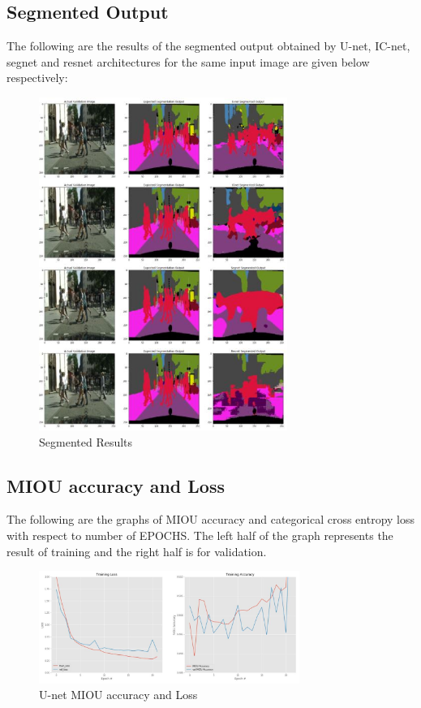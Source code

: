\documentclass{IEEEtran}
\begin{document}
\subsection{\textbf{Segmented Output}} 
The following are the results of the segmented output obtained by U-net, IC-net, segnet and resnet architectures for the same input image are given below respectively:
\begin{figure}[h]
    \centering
    \captionsetup{justification=centering}
    \includegraphics[width=8.1cm]{seg.JPG}
    \caption{Segmented Results}
    \label{fig:Binary class segmented output}
\end{figure}
\newpage

\subsection{\textbf{MIOU accuracy and Loss}} 
The following are the graphs of MIOU accuracy and categorical cross entropy loss with respect to number of EPOCHS. The left half of the graph represents the result of training and the right half is for validation.

\begin{figure}[h]
    \centering
    \captionsetup{justification=centering}
    \includegraphics[width=8.5cm]{U-net-cityscrapes-B16-gr.JPG}
    \caption{U-net MIOU accuracy and Loss}
    \label{fig:Binary class segmented output}
\end{figure}
\end{document}
